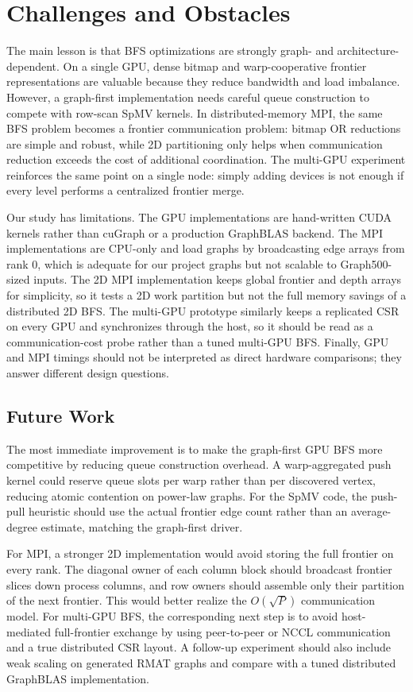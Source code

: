 \documentclass[11pt]{article}
\begin{document}
\FloatBarrier
\section{Challenges and Obstacles}

The main lesson is that BFS optimizations are strongly graph- and
architecture-dependent. On a single GPU, dense bitmap and warp-cooperative
frontier representations are valuable because they reduce bandwidth and load
imbalance. However, a graph-first implementation needs careful queue
construction to compete with row-scan SpMV kernels. In distributed-memory MPI,
the same BFS problem becomes a frontier communication problem: bitmap OR
reductions are simple and robust, while 2D partitioning only helps when
communication reduction exceeds the cost of additional coordination.
The multi-GPU experiment reinforces the same point on a single node: simply
adding devices is not enough if every level performs a centralized frontier
merge.

Our study has limitations. The GPU implementations are hand-written CUDA
kernels rather than cuGraph or a production GraphBLAS backend. The MPI
implementations are CPU-only and load graphs by broadcasting edge arrays from
rank 0, which is adequate for our project graphs but not scalable to
Graph500-sized inputs. The 2D MPI implementation keeps global frontier and depth
arrays for simplicity, so it tests a 2D work partition but not the full memory
savings of a distributed 2D BFS. The multi-GPU prototype similarly keeps a
replicated CSR on every GPU and synchronizes through the host, so it should be
read as a communication-cost probe rather than a tuned multi-GPU BFS. Finally,
GPU and MPI timings should not be interpreted as direct hardware comparisons;
they answer different design questions.

\subsection{Future Work}

The most immediate improvement is to make the graph-first GPU BFS more
competitive by reducing queue construction overhead. A warp-aggregated push
kernel could reserve queue slots per warp rather than per discovered vertex,
reducing atomic contention on power-law graphs. For the SpMV code, the
push-pull heuristic should use the actual frontier edge count rather than an
average-degree estimate, matching the graph-first driver.

For MPI, a stronger 2D implementation would avoid storing the full frontier on
every rank. The diagonal owner of each column block should broadcast frontier
slices down process columns, and row owners should assemble only their
partition of the next frontier. This would better realize the
$O(\sqrt{P})$ communication model. For multi-GPU BFS, the corresponding next
step is to avoid host-mediated full-frontier exchange by using peer-to-peer or
NCCL communication and a true distributed CSR layout. A follow-up experiment
should also include weak scaling on generated RMAT graphs and compare with a
tuned distributed GraphBLAS implementation.
\end{document}
